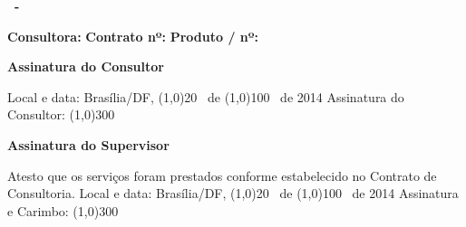 \textbf{\ProjectCode \ -} \ProductDescription

\vspace{3cm}

\begin{minipage}{0.5\textwidth}
  \textbf{Consultora: \MyName}
  \newline
  \textbf{Contrato nº: \ContractNumber}
  \newline
  \textbf{Produto / nº: \ProductNumber}
\end{minipage}

\vspace{2cm}

\textbf{Assinatura do Consultor}

\begin{framed}
Local e data: Brasília/DF, \line(1,0){20} \ de \line(1,0){100} \ de 2014
\newline
\newline
Assinatura do Consultor: \line(1,0){300}
\end{framed}

\vspace{1cm}

\textbf{Assinatura do Supervisor}

\begin{framed}
Atesto que os serviços foram prestados conforme estabelecido no Contrato
de Consultoria.
\newline
\newline
Local e data: Brasília/DF, \line(1,0){20} \ de \line(1,0){100} \ de 2014
\newline
\newline
Assinatura e Carimbo: \line(1,0){300}
\end{framed}
